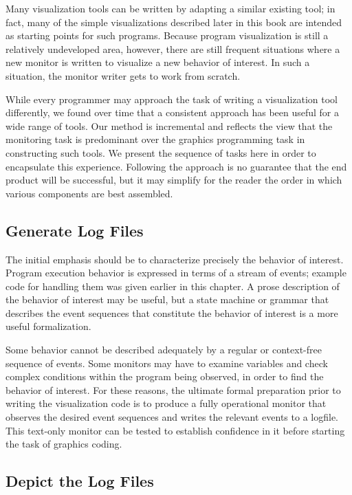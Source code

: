 Many visualization tools can be written by adapting a similar existing tool;
in fact, many of the simple visualizations described later in this book are
intended as starting points for such programs.  Because program
visualization is still a relatively undeveloped area, however, there are
still frequent situations where a new monitor is written to visualize a new
behavior of interest.  In such a situation, the monitor writer gets to work
from scratch.

While every programmer may approach the task of writing a visualization tool
differently, we found over time that a consistent approach has been useful
for a wide range of tools.  Our method is incremental and reflects the view
that the monitoring task is predominant over the graphics programming task
in constructing such tools.  We present the sequence of tasks here in order
to encapsulate this experience.  Following the approach is no guarantee that
the end product will be successful, but it may simplify for the reader the
order in which various components are best assembled.

\subsection*{Generate Log Files}

The initial emphasis should be to characterize precisely the behavior of
interest.  Program execution behavior is expressed in terms of a stream of
events; example code for handling them
was given earlier in this chapter.  A prose description of the behavior of
interest may be useful, but a state machine or grammar that describes the
event sequences that constitute the behavior of interest is a more useful
formalization.

Some behavior cannot be described adequately by a regular or context-free
sequence of events. Some monitors may have to examine
variables and check complex conditions within the program being observed, in
order to find the behavior of interest.  For these reasons, the ultimate
formal preparation prior to writing the visualization code is to produce a
fully operational monitor that observes the desired event sequences and
writes the relevant events to a logfile.  This text-only monitor can be tested
to establish confidence in it before starting the task of graphics coding.

\subsection*{Depict the Log Files}

